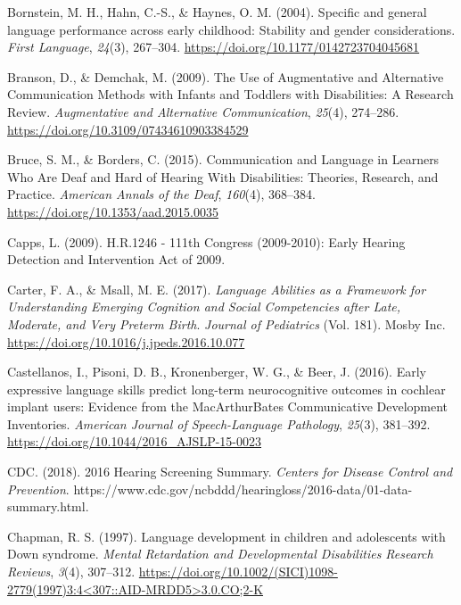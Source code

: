 \documentclass[english,man]{apa6}
\begin{document}
\leavevmode\hypertarget{ref-bornstein2004}{}%
Bornstein, M. H., Hahn, C.-S., \& Haynes, O. M. (2004). Specific and general language performance across early childhood: Stability and gender considerations. \emph{First Language}, \emph{24}(3), 267--304. \url{https://doi.org/10.1177/0142723704045681}

\leavevmode\hypertarget{ref-branson2009}{}%
Branson, D., \& Demchak, M. (2009). The Use of Augmentative and Alternative Communication Methods with Infants and Toddlers with Disabilities: A Research Review. \emph{Augmentative and Alternative Communication}, \emph{25}(4), 274--286. \url{https://doi.org/10.3109/07434610903384529}

\leavevmode\hypertarget{ref-bruce2015}{}%
Bruce, S. M., \& Borders, C. (2015). Communication and Language in Learners Who Are Deaf and Hard of Hearing With Disabilities: Theories, Research, and Practice. \emph{American Annals of the Deaf}, \emph{160}(4), 368--384. \url{https://doi.org/10.1353/aad.2015.0035}

\leavevmode\hypertarget{ref-capps2009}{}%
Capps, L. (2009). H.R.1246 - 111th Congress (2009-2010): Early Hearing Detection and Intervention Act of 2009.

\leavevmode\hypertarget{ref-carter2017}{}%
Carter, F. A., \& Msall, M. E. (2017). \emph{Language Abilities as a Framework for Understanding Emerging Cognition and Social Competencies after Late, Moderate, and Very Preterm Birth}. \emph{Journal of Pediatrics} (Vol. 181). Mosby Inc. \url{https://doi.org/10.1016/j.jpeds.2016.10.077}

\leavevmode\hypertarget{ref-castellanos2016}{}%
Castellanos, I., Pisoni, D. B., Kronenberger, W. G., \& Beer, J. (2016). Early expressive language skills predict long-term neurocognitive outcomes in cochlear implant users: Evidence from the MacArthurBates Communicative Development Inventories. \emph{American Journal of Speech-Language Pathology}, \emph{25}(3), 381--392. \url{https://doi.org/10.1044/2016_AJSLP-15-0023}

\leavevmode\hypertarget{ref-cdc2018}{}%
CDC. (2018). 2016 Hearing Screening Summary. \emph{Centers for Disease Control and Prevention}. https://www.cdc.gov/ncbddd/hearingloss/2016-data/01-data-summary.html.

\leavevmode\hypertarget{ref-chapman1997}{}%
Chapman, R. S. (1997). Language development in children and adolescents with Down syndrome. \emph{Mental Retardation and Developmental Disabilities Research Reviews}, \emph{3}(4), 307--312. \href{https://doi.org/10.1002/(SICI)1098-2779(1997)3:4\%3C307::AID-MRDD5\%3E3.0.CO;2-K}{https://doi.org/10.1002/(SICI)1098-2779(1997)3:4\textless{}307::AID-MRDD5\textgreater{}3.0.CO;2-K}
\end{document}
